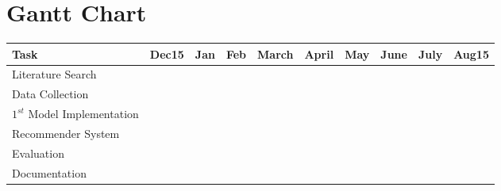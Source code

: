 \documentclass[a4paper, 10pt]{report}   %
\begin{document}
\section*{Gantt Chart}

\begin{tabular}{|l|lllllllll|}
\hline
	Task & Dec15 & Jan & Feb & March & April & May & June & July & Aug15\\
\hline
	Literature Search & \cellcolor{green} & \cellcolor{green}& & & & & & & \\
\hline
	Data Collection &  & & & \cellcolor{green}& & & & & \\
\hline
	$1^{st}$ Model Implementation &  & & & \cellcolor{green}& \cellcolor{green}& & & & \\
\hline
	Recommender System &  & & & &\cellcolor{green} & \cellcolor{green}& & & \\
\hline
	Evaluation &  & & & & &\cellcolor{green} &\cellcolor{green} & & \\
\hline
	Documentation &  &\cellcolor{green}&\cellcolor{green} &\cellcolor{green} & \cellcolor{green}& \cellcolor{green}& \cellcolor{green}& \cellcolor{green}& \cellcolor{green}\\
\hline

\end{tabular}


{}

\end{document}
